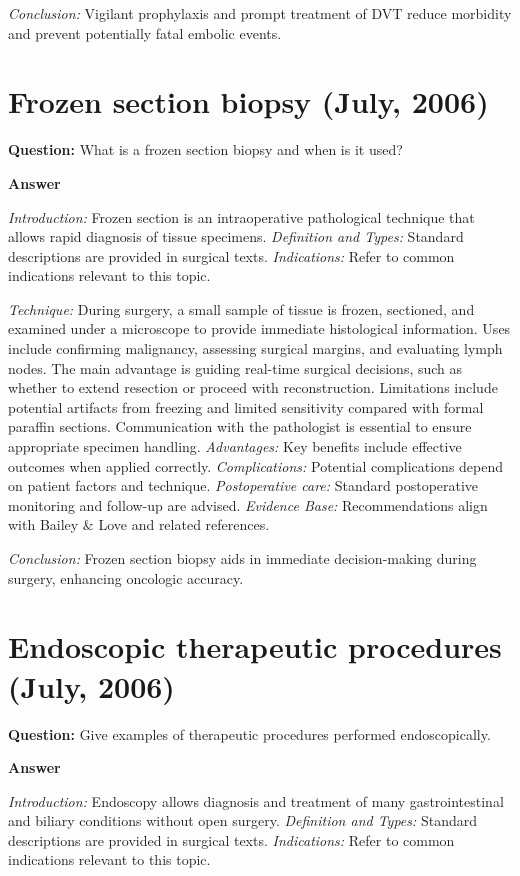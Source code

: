 \documentclass{article}
\begin{document}
\emph{Conclusion:} Vigilant prophylaxis and prompt treatment of DVT reduce morbidity and prevent potentially fatal embolic events.


\section{Frozen section biopsy (July, 2006)}

\textbf{Question:} What is a frozen section biopsy and when is it used?

\textbf{Answer}

\emph{Introduction:} Frozen section is an intraoperative pathological technique that allows rapid diagnosis of tissue specimens.
\emph{Definition and Types:} Standard descriptions are provided in surgical texts.
\emph{Indications:} Refer to common indications relevant to this topic.

\emph{Technique:} During surgery, a small sample of tissue is frozen, sectioned, and examined under a microscope to provide immediate histological information. Uses include confirming malignancy, assessing surgical margins, and evaluating lymph nodes. The main advantage is guiding real-time surgical decisions, such as whether to extend resection or proceed with reconstruction. Limitations include potential artifacts from freezing and limited sensitivity compared with formal paraffin sections. Communication with the pathologist is essential to ensure appropriate specimen handling.
\emph{Advantages:} Key benefits include effective outcomes when applied correctly.
\emph{Complications:} Potential complications depend on patient factors and technique.
\emph{Postoperative care:} Standard postoperative monitoring and follow-up are advised.
\emph{Evidence Base:} Recommendations align with Bailey \& Love and related references.

\emph{Conclusion:} Frozen section biopsy aids in immediate decision-making during surgery, enhancing oncologic accuracy.


\section{Endoscopic therapeutic procedures (July, 2006)}

\textbf{Question:} Give examples of therapeutic procedures performed endoscopically.

\textbf{Answer}

\emph{Introduction:} Endoscopy allows diagnosis and treatment of many gastrointestinal and biliary conditions without open surgery.
\emph{Definition and Types:} Standard descriptions are provided in surgical texts.
\emph{Indications:} Refer to common indications relevant to this topic.
\end{document}
